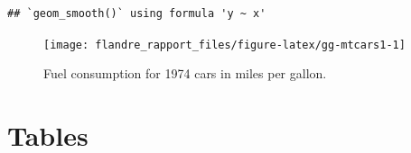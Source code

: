 \documentclass[twoside]{extreport}
\begin{document}
\begin{verbatim}
## `geom_smooth()` using formula 'y ~ x'
\end{verbatim}

\begin{figure}

{\centering \texttt{[image: flandre\_rapport\_files/figure-latex/gg-mtcars1-1]} 

}

\caption{Fuel consumption for 1974 cars in miles per gallon.}\label{fig:gg-mtcars1}
\end{figure}

\hypertarget{tables-1}{%
\chapter{Tables}\label{tables-1}}
\end{document}
